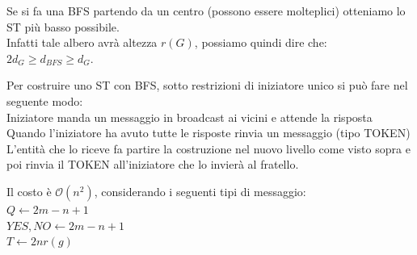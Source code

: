 Se si fa una BFS partendo da un centro (possono essere molteplici) otteniamo lo
ST più basso possibile.\\
Infatti tale albero avrà altezza $r(G)$, possiamo quindi dire che: $2 d_G \geq
    d_{BFS} \geq d_G$.

Per costruire uno ST con BFS, sotto restrizioni di iniziatore unico si può fare
nel seguente modo:\\
Iniziatore manda un messaggio in broadcast ai vicini e attende la risposta\\
Quando l'iniziatore ha avuto tutte le risposte rinvia un messaggio (tipo
TOKEN)\\
L'entità che lo riceve fa partire la costruzione nel nuovo livello come visto
sopra e poi rinvia il TOKEN all'iniziatore che lo invierà al fratello.

Il costo è $\mathcal{O}(n^2)$, considerando i seguenti tipi di messaggio:\\
$Q \leftarrow 2m - n +1$\\
$YES, NO \leftarrow 2m -n +1$\\
$T \leftarrow 2n r(g)$
